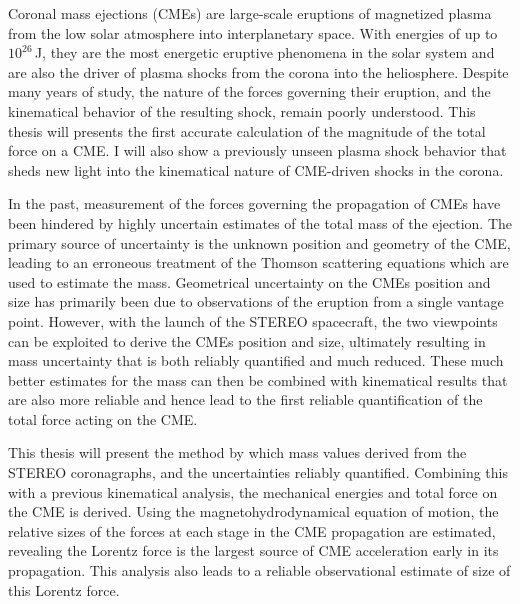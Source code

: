 
\begin{abstracts} 

Coronal mass ejections (CMEs) are large-scale eruptions of magnetized plasma from the low solar atmosphere into interplanetary space. With energies of up to $10^{26}$\,J, they are the most energetic eruptive phenomena in the solar system and are also the driver of plasma shocks from the corona into the heliosphere. Despite many years of study, the nature of the forces governing their eruption, and the kinematical behavior of the resulting shock, remain poorly understood. This thesis will presents the first accurate calculation of the magnitude of the total force on a CME. I will also show a previously unseen plasma shock behavior that sheds new light into the kinematical nature of CME-driven shocks in the corona.

In the past, measurement of the forces governing the propagation of CMEs have been hindered by highly uncertain estimates of the total mass of the ejection. The primary source of uncertainty is the unknown position and geometry of the CME, leading to an erroneous treatment of the Thomson scattering equations which are used to estimate the mass. Geometrical uncertainty on the CMEs position and size has primarily been due to observations of the eruption from a single vantage point. However, with the launch of the STEREO spacecraft, the two viewpoints can be exploited to derive the CMEs position and size, ultimately resulting in mass uncertainty that is both reliably quantified and much reduced. These much better estimates for the mass can then be combined with kinematical results that are also more reliable and hence lead to the first reliable quantification of the total force acting on the CME. 

This thesis will present the method by which mass values derived from the STEREO coronagraphs, and the uncertainties reliably quantified. Combining this with a previous kinematical analysis, the mechanical energies and total force on the CME is derived. Using the magnetohydrodynamical equation of motion, the relative sizes of the forces at each stage in the CME propagation are estimated, revealing the Lorentz force is the largest source of CME acceleration early in its propagation. This analysis also leads to a reliable observational estimate of size of this Lorentz force.


\end{abstracts}
